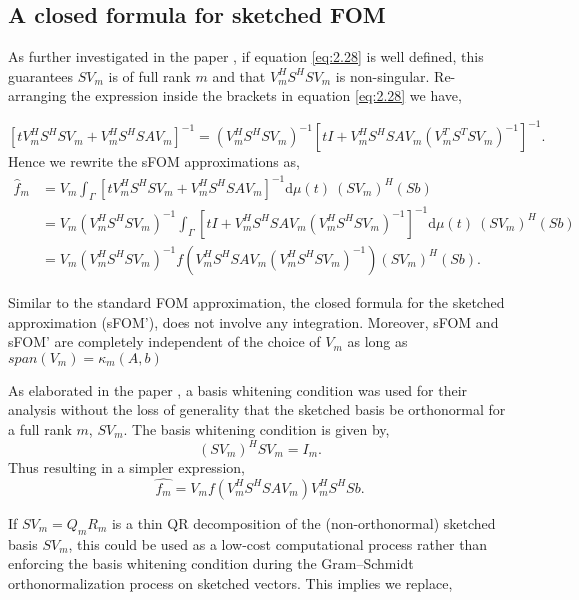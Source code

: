 \subsection{ A closed formula for sketched FOM}
\label{sec_sketched_FOM}

As further investigated in the paper \cite{41}, if equation \eqref{eq:2.28} is well defined, this guarantees $SV_m$ is of full rank $m$ and that $V_m^{H}S^{H}SV_m$ is non-singular. Re-arranging the expression inside the brackets in equation \eqref{eq:2.28} we have,

\[\left[ t V_m^H S^H S V_m + V_m^H S^H S A V_m \right]^{-1} 
= \left( V_m^H S^H S V_m \right)^{-1} \left[ t I + V_m^H S^H S A V_m \left( V_m^T S^T S V_m \right)^{-1} \right]^{-1}.
\]
Hence we rewrite the sFOM approximations as,
\begin{align*}
    \hat{f}_m &= V_m \int_{\Gamma} \left[ tV_m^H S^H S V_m + V_m^H S^H S A V_m \right]^{-1} \mathrm{d}\mu(t) \ (SV_m)^H (Sb) \\
            &= V_m (V_m^H S^H S V_m)^{-1} \int_{\Gamma} \left[ tI + V_m^H S^H S A V_m (V_m^H S^H S V_m)^{-1} \right]^{-1} \mathrm{d}\mu(t) \ (SV_m)^H (Sb) \\
            &= V_m (V_m^H S^H S V_m)^{-1} f \left( V_m^H S^H S A V_m (V_m^H S^H S V_m)^{-1} \right) (SV_m)^H (Sb).
    \tag{\footnotesize sFOM'}
\end{align*}

Similar to the standard FOM approximation, the closed formula for the sketched approximation (sFOM'), does not involve any integration. Moreover, sFOM and sFOM' are completely independent of the choice of $V_m$ as long as $span(V_m) = \kappa_m(A, b)$

As elaborated in the paper \cite{41}, a basis whitening condition was used for their analysis without the loss of generality that the sketched basis be orthonormal for a full rank $m$, $SV_m$. The basis whitening condition is given by,
\begin{equation}
    (SV_m)^{H}SV_m = I_m.
    \label{eq:2.29}
\end{equation}
Thus resulting in a simpler expression,
\[
    \hat{f_m} = V_mf(V_m^{H}S^{H}SAV_m)V_m^{H}S^{H}Sb.
    \tag{\footnotesize sFOM''}
\]

If $SV_m = Q_mR_m$ is a thin QR decomposition of the (non-orthonormal) sketched basis $SV_m$, this could be used as a low-cost computational process rather than enforcing the basis whitening condition during the Gram–Schmidt orthonormalization process on sketched vectors. This implies we replace,

